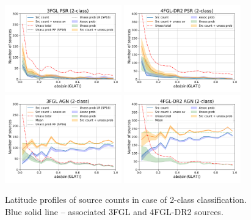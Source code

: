 \begin{figure}[h]
\centering
\includegraphics[width=0.45\textwidth]{plots/lat_profile_PSR_3FGL_2classes.pdf}
\includegraphics[width=0.45\textwidth]{plots/lat_profile_PSR_4FGL-DR2_2classes.pdf} \\
\includegraphics[width=0.45\textwidth]{plots/lat_profile_AGN_3FGL_2classes.pdf}
\includegraphics[width=0.45\textwidth]{plots/lat_profile_AGN_4FGL-DR2_2classes.pdf}
\caption{Latitude profiles of source counts in case of 2-class classification. 
Blue solid line -- associated 3FGL and 4FGL-DR2  sources. 
}
\end{figure}

